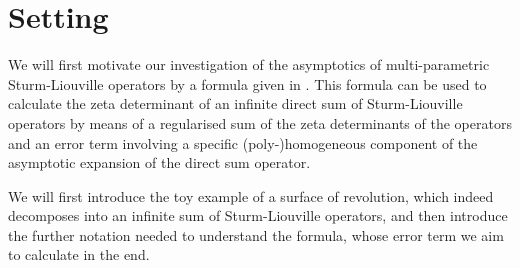 \section{Setting}
We will first motivate our investigation of the asymptotics of multi-parametric
Sturm-Liouville operators by a formula given in \cite{LV13}. This formula can be
used to calculate the zeta determinant of an infinite direct sum of
Sturm-Liouville operators by means of a regularised sum of the zeta determinants
of the operators and an error term involving a specific (poly-)homogeneous
component of the asymptotic expansion of the direct sum operator.

We will first introduce the toy example of a surface of revolution, which indeed
decomposes into an infinite sum of Sturm-Liouville operators, and then introduce
the further notation needed to understand the formula, whose error term we aim
to calculate in the end.

